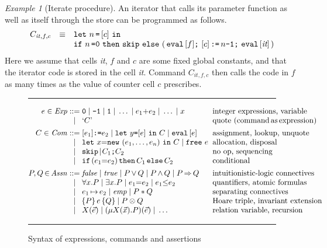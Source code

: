 \documentclass{LMCS}
\theoremstyle{remark}
\newtheorem{example}[theorem]{Example}
\newcommand{\SEXP}{{\mathit{Exp}}\xspace}
\newcommand{\SCOM}{{\mathit{Com}}\xspace}
\newcommand{\QUOTE}[1]{\textnormal{`\ensuremath{#1}'}}
\newcommand{\UNQUOTE}[1]{\SYN{eval}\,{#1}}
\newcommand{\SYN}[1]{\ensuremath{\texttt{#1}}}
\newcommand{\bnfeq}{\ensuremath{::=}}
\newcommand{\hmid}{\ensuremath{\;|\;}}
\newcommand{\triple}[3]{{\ensuremath{\!\left.\{ #1 \}\, #2\, \{  #3 \}\!\right.}}}
\newcommand{\True}{\ensuremath{\mathit{true}}}
\newcommand{\False}{\ensuremath{\mathit{false}}}
\newcommand{\ASR}{{\mathit{Assn}}\xspace}
\newcommand{\EMP}{\ensuremath{\textit{emp}}}
\begin{document}
\begin{example}[Iterate procedure] 
An iterator that calls its parameter function as well as itself through the store can be programmed as follows. 
\[
\begin{array}{lcl}
C_{\mathit{it},f,c} & \equiv & \SYN{let}\ n\, \SYN{=}\, [c]\ \SYN{in} \\
&& \SYN{if}\ n\,\SYN{=0}\ \SYN{then}\ \SYN{skip}\  \SYN{else}\  (\,  \UNQUOTE{[f]} \SYN{;}\ [c]\, \SYN{:=}\, n \SYN{-1} \SYN{;}\ \UNQUOTE{[\emph{it}]} \, ) 
\end{array}\] 
Here we assume that cells \emph{it}, $f$ and $c$ are some fixed global constants, and that the iterator code is stored in the cell \emph{it}.
Command $C_{\mathit{it},f,c}$ then calls the code in $f$ as many times as the value of counter cell $c$ prescribes.
\end{example}


\begin{figure*}[t]
\hrule
$$
\begin{array}{@{}r@{\;}c@{\;}l@{\;\;}l@{}}
e\in\SEXP 
& \bnfeq &
  \SYN{0}\hmid 
  \SYN{-1}\hmid
  \SYN{1}\hmid
  \dots\hmid  
  e_1{+}e_2 \hmid 
  \dots \hmid
  x 
& \mbox{integer expressions, variable} 
\\
& \hmid & 
  \QUOTE{C} 
& \mbox{quote (command\,as\,expression)} 
\\[1ex]
C\in\SCOM 
& \bnfeq &
   [e_1]\SYN{:=}e_2 \hmid
  \SYN{let}~y\SYN{=}[e]~\SYN{in}~C \hmid
  \UNQUOTE [e] 
  & \mbox{assignment, lookup, unquote}
\\
& \hmid &
  \SYN{let}~x{=}\SYN{new}~(e_1,\ldots,e_n)~\SYN{in}~C\hmid\SYN{free}~e
  & \mbox{allocation, disposal}
\\
& \hmid &
  \SYN{skip}\! \hmid \!
  C_1\SYN{;}C_2 
  & \mbox{no op, sequencing } 
\\
& \hmid &
  \SYN{if}\,(e_1{=}e_2)\,\SYN{then}\,C_1\,\SYN{else}\,C_2   
  & \mbox{conditional} 
\\[1ex]
P,Q 
\,{\in}\, \ASR 
& \bnfeq & 
   \False \hmid 
   \True \hmid 
   P\,{\vee}\, Q \hmid 
   P\,{\wedge}\,Q \hmid 
   P\,{\Rightarrow}\, Q
   & \mbox{intuitionistic-logic connectives} 
\\
& \hmid &
   \forall x. P \hmid
   \exists x. P \hmid 
e_1 {=} e_2 \hmid 
   e_1 {\leq} e_2 
  & \mbox{quantifiers, atomic formulas} 
\\
& \hmid &  
   e_1\,{\mapsto}\, e_2 \hmid 
   \EMP \hmid 
   P*Q 
& \mbox{separating connectives} 
\\
& \hmid &  
  \triple{P}{e}{Q} \hmid 
   P\otimes Q 
& \mbox{Hoare triple, invariant extension}
\\
&\hmid & 
X(\vec e)\hmid (\mu X(\vec x).P)(\vec e)\hmid 
   \dots
   &\mbox{relation variable, recursion}
\end{array}
$$
\hrule
\caption{\label{fig:LanguageSyntax-alt}Syntax of expressions, commands and assertions}
\end{figure*}
\end{document}
